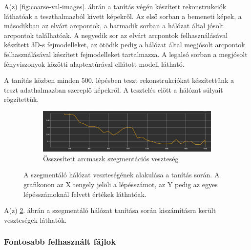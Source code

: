 \documentclass[12pt,a4]{article}
\begin{document}
        A(z) \ref{fig:coarse-val-images}. ábrán a tanítás végén készített rekonstrukciók láthatóak a teszthalmazból kivett képekről. Az első sorban a bemeneti képek, a másodikban az elvárt arcpontok, a harmadik sorban a hálózat által jósolt arcpontok találhatóak. A negyedik sor az elvárt arcpontok felhasználásával készített 3D-s fejmodelleket, az ötödik pedig a hálózat által megjósolt arcpontok felhasználásával készített fejmodelleket tartalmazza. A legalsó sorban a megjósolt fényviszonyok közötti alaptextúrával ellátott modell látható.

        A tanítás közben minden $500$. lépésben teszt rekonstrukciókat készítettünk a teszt adathalmazban szereplő képekről. A tesztelés előtt a hálózat súlyait rögzítettük.
        
          \begin{figure}[h!]
            \centering
            \begin{subfigure}[b]{0.55\textwidth}
               \includegraphics[width=1\linewidth]{coarse-unet-all-loss.jpg}
               \caption{Összesített arcmaszk szegmentációs veszteség}
               \label{fig:coarse-unet-all-loss} 
            \end{subfigure}
            \caption{A szegmentáló hálózat veszteségének alakulása a tanítás során. A grafikonon az X tengely jelöli a lépésszámot, az Y pedig az egyes lépésszámoknál felvett értékek láthatóak.}
            \label{fig:coarse-unet-loss-results}
        \end{figure}

        A(z) \ref{fig:coarse-unet-loss-results}. ábrán a szegmentáló hálózat tanítása során kiszámításra került veszteségek láthatók.
        
                
        
        
    \subsubsection{Fontosabb felhasznált fájlok}
\end{document}
